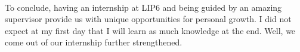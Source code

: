 \documentclass[12pt]{report}
\begin{document}
\paragraph{}
To conclude, having an internship at LIP6 and being guided by an amazing supervisor provide us with unique opportunities for personal growth. I did not expect at my first day that I will learn as much knowledge at the end. Well, we come out of our internship further strengthened. 
	
	


\end{document}
